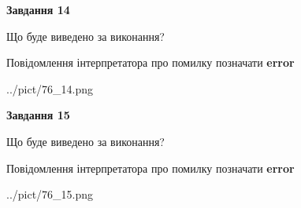 \documentclass[11pt, ukrainian]{article}
\begin{document}
{\begin {large}
{\begin {center}\textbf{Завдання 14}\end {center}}\par
Що буде виведено за виконання? \par
Повідомлення інтерпретатора про помилку позначати \textbf{error}

\begin{center}
	{../pict/76_14.png}
\end{center}
\newpage

{\begin {center}\textbf{Завдання 15}\end {center}}\par
Що буде виведено за виконання? \par
Повідомлення інтерпретатора про помилку позначати \textbf{error}

\begin{center}
	{../pict/76_15.png}
\end{center}
\newpage

\end {large}}
\end{document}
